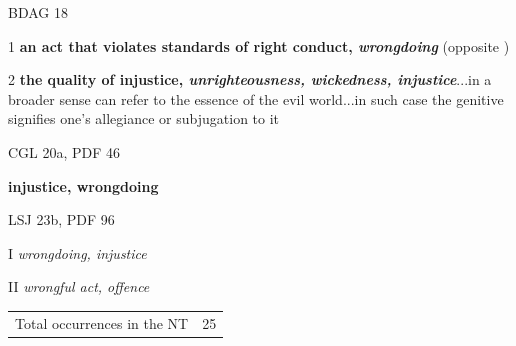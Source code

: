 				\begin{compactdesc}
					\item[BDAG 18] \textbf{}
						\begin{compactitem}
							\item[1] \textbf{an act that violates standards of right conduct, \textit{wrongdoing}} (opposite )
							\item[2] \textbf{the quality of injustice, \textit{unrighteousness, wickedness, injustice}}...in a broader sense  can refer to the essence of the evil world...in such case the genitive signifies one's allegiance or subjugation to it
						\end{compactitem}
					\item[CGL 20a, PDF 46] \textbf{}
						\begin{compactitem}
							\item \textbf{injustice, wrongdoing}
						\end{compactitem}
					\item[LSJ 23b, PDF 96] \textbf{}
						\begin{compactitem}
							\item[I] \textit{wrongdoing, injustice}
							\item[II] \textit{wrongful act, offence}
						\end{compactitem}
				\end{compactdesc}
				
				\begin{tabular}{ll}
					Total occurrences in the NT & 25
				\end{tabular}
				
			
			\subparagraph{\texorpdfstring{}{}}
				\label{DIKAIOS}
			
